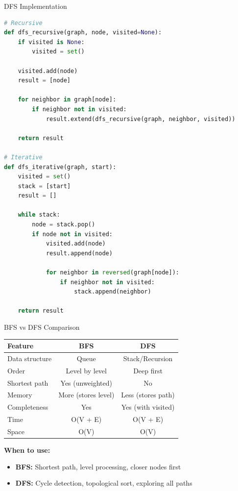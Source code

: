 \documentclass[aspectratio=169]{beamer}
\begin{document}
\begin{frame}[fragile]{DFS Implementation}
  \begin{lstlisting}[language=Python, basicstyle=\ttfamily\footnotesize]
# Recursive
def dfs_recursive(graph, node, visited=None):
    if visited is None:
        visited = set()

    visited.add(node)
    result = [node]

    for neighbor in graph[node]:
        if neighbor not in visited:
            result.extend(dfs_recursive(graph, neighbor, visited))

    return result

# Iterative
def dfs_iterative(graph, start):
    visited = set()
    stack = [start]
    result = []

    while stack:
        node = stack.pop()
        if node not in visited:
            visited.add(node)
            result.append(node)

            for neighbor in reversed(graph[node]):
                if neighbor not in visited:
                    stack.append(neighbor)

    return result
  \end{lstlisting}
\end{frame}

\begin{frame}{BFS vs DFS Comparison}
  \begin{table}
    \centering
    \begin{tabular}{|l|c|c|}
      \hline
      \textbf{Feature} & \textbf{BFS} & \textbf{DFS} \\
      \hline
      Data structure & Queue & Stack/Recursion \\
      \hline
      Order & Level by level & Deep first \\
      \hline
      Shortest path & Yes (unweighted) & No \\
      \hline
      Memory & More (stores level) & Less (stores path) \\
      \hline
      Completeness & Yes & Yes (with visited) \\
      \hline
      Time & O(V + E) & O(V + E) \\
      \hline
      Space & O(V) & O(V) \\
      \hline
    \end{tabular}
  \end{table}

  \vspace{0.5cm}
  \textbf{When to use:}
  \begin{itemize}
    \item \textbf{BFS:} Shortest path, level processing, closer nodes first
    \item \textbf{DFS:} Cycle detection, topological sort, exploring all paths
  \end{itemize}
\end{frame}
\end{document}
